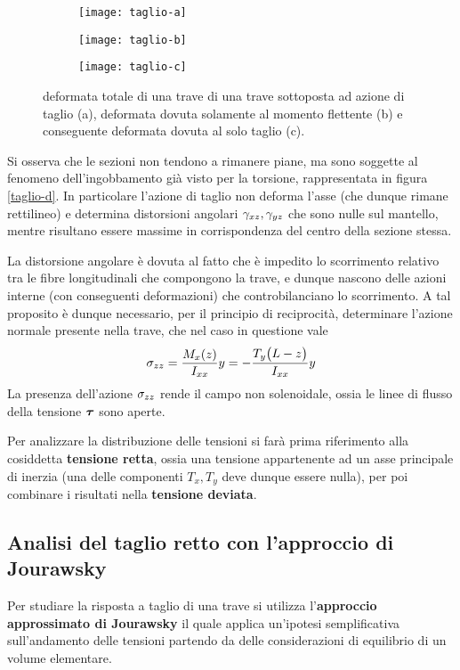 	\begin{figure}[bht]
		\centering
		\begin{subfigure}{0.32\linewidth}
			\centering \texttt{[image: taglio-a]} \caption{}
		\end{subfigure}
		\begin{subfigure}{0.32\linewidth}
			\centering \texttt{[image: taglio-b]} \caption{}
		\end{subfigure}
		\begin{subfigure}{0.32\linewidth}
			\centering \texttt{[image: taglio-c]} \caption{}
		\end{subfigure}
		\caption{deformata totale di una trave di una trave sottoposta ad azione di taglio (a), deformata dovuta solamente al momento flettente (b) e conseguente deformata dovuta al solo taglio (c).}
		\label{fig:taglio:schemadeformazione}
	\end{figure}
	
	Si osserva che le sezioni non tendono a rimanere piane, ma sono soggette al fenomeno dell'ingobbamento già visto per la torsione, rappresentata in figura \ref{taglio-d}. In particolare l'azione di taglio non deforma l'asse (che dunque rimane rettilineo) e determina distorsioni angolari $\gamma_{xz},\gamma_{yz}$ che sono nulle sul mantello, mentre risultano essere massime in corrispondenza del centro della sezione stessa.
	
	
	La distorsione angolare è dovuta al fatto che è impedito lo scorrimento relativo tra le fibre longitudinali che compongono la trave, e dunque nascono delle azioni interne (con conseguenti deformazioni) che controbilanciano lo scorrimento. A tal proposito è dunque necessario, per il principio di reciprocità, determinare l'azione normale presente nella trave, che nel caso in questione vale
	\[ \sigma_{zz} = \frac{M_x(z)}{I_{xx}}y = -\frac{T_y\big(L-z\big)}{I_{xx}}y \]
	La presenza dell'azione $\sigma_{zz}$ rende il campo non solenoidale, ossia le linee di flusso della tensione $\boldsymbol{\tau}$ sono aperte.
	
	Per analizzare la distribuzione delle tensioni si farà prima riferimento alla cosiddetta \textbf{tensione retta}, ossia una tensione appartenente ad un asse principale di inerzia (una delle componenti $T_x,T_y$ deve dunque essere nulla), per poi combinare i risultati nella \textbf{tensione deviata}. 
	
	\subsection{Analisi del taglio retto con l'approccio di Jourawsky}
		Per studiare la risposta a taglio di una trave si utilizza l'\textbf{approccio approssimato di Jourawsky} il quale applica un'ipotesi semplificativa sull'andamento delle tensioni partendo da delle considerazioni di equilibrio di un volume elementare.
		
